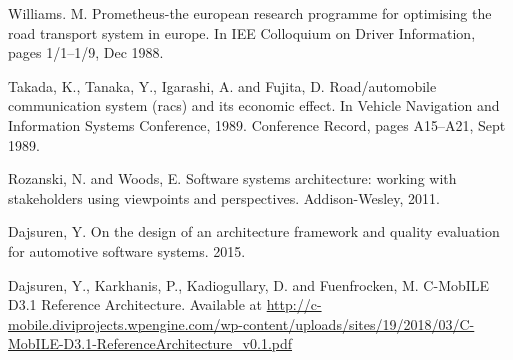 \documentclass[conference]{IEEEtran}
\begin{document}
\begin{thebibliography}{00}
     Williams. M. Prometheus-the european research programme for optimising the road transport
    system in europe. In IEE Colloquium on Driver Information, pages 1/1–1/9, Dec 1988.
    
     Takada, K., Tanaka, Y., Igarashi, A. and Fujita, D. Road/automobile communication system
    (racs) and its economic effect. In Vehicle Navigation and Information Systems Conference,
    1989. Conference Record, pages A15–A21, Sept 1989.
    
     Rozanski, N. and Woods, E. Software systems architecture: working with stakeholders using viewpoints and perspectives. Addison-Wesley, 2011.
    
     Dajsuren, Y. On the design of an architecture framework and quality evaluation for automotive software systems. 2015.
    
     Dajsuren, Y., Karkhanis, P., Kadiogullary, D. and Fuenfrocken, M. C-MobILE D3.1 Reference Architecture. Available at \url{http://c-mobile.diviprojects.wpengine.com/wp-content/uploads/sites/19/2018/03/C-MobILE-D3.1-ReferenceArchitecture_v0.1.pdf}
  
\end{thebibliography}
\end{document}
